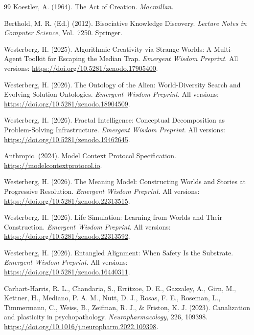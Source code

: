 \begin{thebibliography}{99}
Koestler, A. (1964).
The Act of Creation.
\textit{Macmillan}.

Berthold, M. R. (Ed.) (2012).
Bisociative Knowledge Discovery.
\textit{Lecture Notes in Computer Science}, Vol.~7250. Springer.

Westerberg, H. (2025).
Algorithmic Creativity via Strange Worlds: A Multi-Agent Toolkit for Escaping the Median Trap.
\textit{Emergent Wisdom Preprint}.
All versions: \url{https://doi.org/10.5281/zenodo.17905400}.

Westerberg, H. (2026).
The Ontology of the Alien: World-Diversity Search and Evolving Solution Ontologies.
\textit{Emergent Wisdom Preprint}.
All versions: \url{https://doi.org/10.5281/zenodo.18904509}.

Westerberg, H. (2026).
Fractal Intelligence: Conceptual Decomposition as Problem-Solving Infrastructure.
\textit{Emergent Wisdom Preprint}. All versions: \url{https://doi.org/10.5281/zenodo.19462645}.

Anthropic. (2024).
Model Context Protocol Specification.
\url{https://modelcontextprotocol.io}.

Westerberg, H. (2026).
The Meaning Model: Constructing Worlds and Stories at Progressive Resolution.
\textit{Emergent Wisdom Preprint}. All versions: \url{https://doi.org/10.5281/zenodo.22313515}.

Westerberg, H. (2026).
Life Simulation: Learning from Worlds and Their Construction.
\textit{Emergent Wisdom Preprint}. All versions: \url{https://doi.org/10.5281/zenodo.22313592}.

Westerberg, H. (2026).
Entangled Alignment: When Safety Is the Substrate.
\textit{Emergent Wisdom Preprint}.
All versions: \url{https://doi.org/10.5281/zenodo.16440311}.

Carhart-Harris, R. L., Chandaria, S., Erritzoe, D. E., Gazzaley, A., Girn, M., Kettner, H., Mediano, P. A. M., Nutt, D. J., Rosas, F. E., Roseman, L., Timmermann, C., Weiss, B., Zeifman, R. J., \& Friston, K. J. (2023).
Canalization and plasticity in psychopathology.
\textit{Neuropharmacology}, 226, 109398.
\url{https://doi.org/10.1016/j.neuropharm.2022.109398}.

\end{thebibliography}


